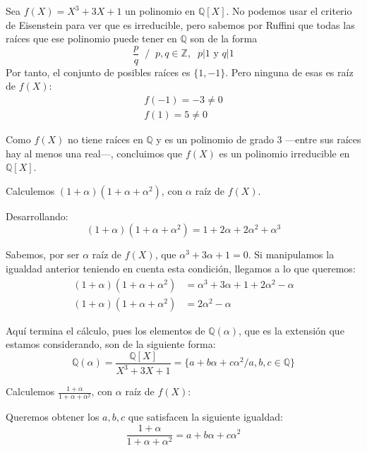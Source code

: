 \documentclass[a4paper, 11pt]{article}
\begin{document}
  \begin{solucion}
      Sea $f(X) = X^3 + 3X + 1$ un polinomio en $\mathbb{Q}[X]$. No podemos usar el criterio de Eisenstein para ver que es irreducible, pero sabemos por Ruffini que todas las raíces que ese polinomio puede tener en $\mathbb{Q}$ son de la forma
      \[
      \frac{p}{q}\;\; / \;\; p,q\in\mathbb{Z},\;\; p|1 \textrm{ y } q|1
      \]Por tanto, el conjunto de posibles raíces es $\{1,-1\}$. Pero ninguna de esas es raíz de $f(X)$:
      \begin{align*}
          f(-1) = -3 \neq 0 \\
          f(1) = 5 \neq 0
      \end{align*}

      Como $f(X)$ no tiene raíces en $\mathbb{Q}$ y es un polinomio de grado 3 ---entre sus raíces hay al menos una real---, concluimos que $f(X)$ es un polinomio irreducible en $\mathbb{Q}[X]$.

      \begin{apartado}
          Calculemos $(1+\alpha)(1+\alpha+\alpha^2)$, con $\alpha$ raíz de $f(X)$.

          Desarrollando:
          \[
              (1+\alpha)(1+\alpha+\alpha^2) = 1 + 2\alpha + 2\alpha^2 + \alpha^3
          \]

          Sabemos, por ser $\alpha$ raíz de $f(X)$, que $\alpha^3 + 3\alpha + 1 = 0$. Si manipulamos la igualdad anterior teniendo en cuenta esta condición, llegamos a lo que queremos:
          \begin{align*}
              (1+\alpha)(1+\alpha+\alpha^2) &= \alpha^3 + 3\alpha + 1 + 2\alpha^2 - \alpha \\
              (1+\alpha)(1+\alpha+\alpha^2) &= 2\alpha^2 - \alpha
          \end{align*}

          Aquí termina el cálculo, pues los elementos de $\mathbb{Q}(\alpha)$, que es la extensión que estamos considerando, son de la siguiente forma:
          \[
          \mathbb{Q}(\alpha) = \frac{\mathbb{Q}[X]}{X^3+3X+1} = \{a + b\alpha + c\alpha^2 / a,b,c\in\mathbb{Q}\}
          \]
      \end{apartado}

      \begin{apartado}
          Calculemos $\frac{1+\alpha}{1+\alpha+\alpha^2}$, con $\alpha$ raíz de $f(X)$:

          Queremos obtener los $a,b,c$ que satisfacen la siguiente igualdad:
          \[
          \frac{1+\alpha}{1+\alpha+\alpha^2} = a + b\alpha + c\alpha^2
          \]


\end{apartado}
\end{solucion}
\end{document}
